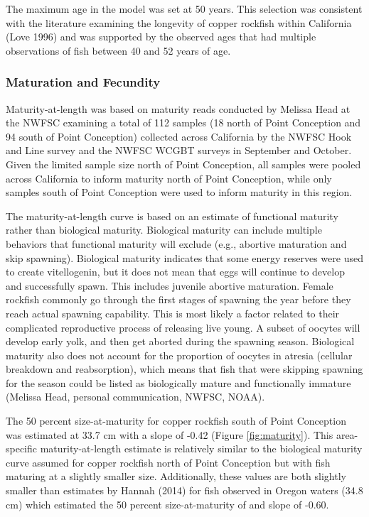\documentclass[11pt,
  english,
  letterpaper,
]{article}
\begin{document}
The maximum age in the model was set at 50 years. This selection was consistent with the literature examining the longevity of copper rockfish within California (Love 1996) and was supported by the observed ages that had multiple observations of fish between 40 and 52 years of age.

\hypertarget{maturation-and-fecundity}{%
\subsubsection{Maturation and Fecundity}\label{maturation-and-fecundity}}

Maturity-at-length was based on maturity reads conducted by Melissa Head at the NWFSC examining a total of 112 samples (18 north of Point Conception and 94 south of Point Conception) collected across California by the NWFSC Hook and Line survey and the NWFSC WCGBT surveys in September and October. Given the limited sample size north of Point Conception, all samples were pooled across California to inform maturity north of Point Conception, while only samples south of Point Conception were used to inform maturity in this region.

The maturity-at-length curve is based on an estimate of functional maturity rather than biological maturity. Biological maturity can include multiple behaviors that functional maturity will exclude (e.g., abortive maturation and skip spawning). Biological maturity indicates that some energy reserves were used to create vitellogenin, but it does not mean that eggs will continue to develop and successfully spawn. This includes juvenile abortive maturation. Female rockfish commonly go through the first stages of spawning the year before they reach actual spawning capability. This is most likely a factor related to their complicated reproductive process of releasing live young. A subset of oocytes will develop early yolk, and then get aborted during the spawning season. Biological maturity also does not account for the proportion of oocytes in atresia (cellular breakdown and reabsorption), which means that fish that were skipping spawning for the season could be listed as biologically mature and functionally immature (Melissa Head, personal communication, NWFSC, NOAA).

The 50 percent size-at-maturity for copper rockfish south of Point Conception was estimated at 33.7 cm with a slope of -0.42 (Figure \ref{fig:maturity}). This area-specific maturity-at-length estimate is relatively similar to the biological maturity curve assumed for copper rockfish north of Point Conception but with fish maturing at a slightly smaller size. Additionally, these values are both slightly smaller than estimates by Hannah (2014) for fish observed in Oregon waters (34.8 cm) which estimated the 50 percent size-at-maturity of and slope of -0.60.
\end{document}
